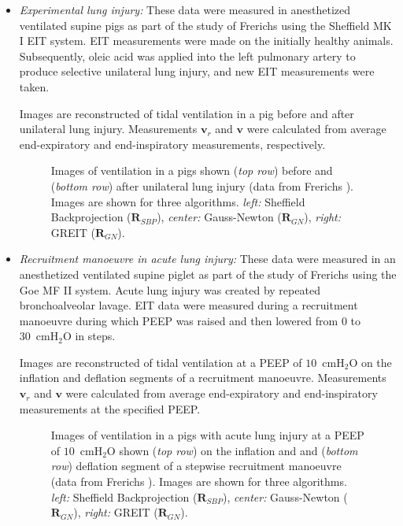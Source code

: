 \documentclass[12pt]{iopart}
\newcommand{\vB}{\mbox{$\mathbf{v}$}}
\newcommand{\RB}{\mbox{$\mathbf{R}$}}
\begin{document}
\begin{itemize}
\item
{\em Experimental lung injury:}
These data were measured in anesthetized
ventilated supine pigs as part of the study of
Frerichs  using the 
Sheffield MK I EIT system. EIT measurements
were made on the initially healthy animals.
Subsequently, oleic acid was applied 
into the left pulmonary artery to produce
selective unilateral lung injury, and new 
EIT measurements were taken. 

Images are reconstructed of tidal ventilation
in a pig before and after unilateral lung
injury. Measurements $\vB_r$ and $\vB$
were calculated from average end-expiratory
and end-inspiratory measurements, respectively.

\begin{figure}[bhtp]
\begin{center}
\caption{
\label{fig:Frerichs98images}
Images of ventilation in a pigs shown ({\em top row})
before and ({\em bottom row}) after unilateral
lung injury (data from Frerichs ).
Images are shown for three algorithms.
{\em left:} Sheffield Backprojection ($\RB_{SBP}$),
{\em center:} Gauss-Newton ($\RB_{GN}$),
{\em right:} GREIT ($\RB_{GN}$).
}
\end{center}
\end{figure}

\item
{\em Recruitment manoeuvre in acute lung injury:}
These data were measured in an anesthetized
ventilated supine piglet as part of the study of
Frerichs  using the 
Goe MF II system. Acute lung injury
was created by repeated
bronchoalveolar lavage. EIT data were
measured during a recruitment manoeuvre
during which PEEP was raised and then
lowered from 0 to 30~cmH$_2$O in steps. 

Images are reconstructed of tidal ventilation
at a PEEP of $10$~cmH$_2$O on the inflation
and deflation segments of a recruitment manoeuvre.
Measurements $\vB_r$ and $\vB$
were calculated from average end-expiratory
and end-inspiratory measurements at the specified
PEEP.

\begin{figure}[bhtp]
\begin{center}
\caption{
\label{fig:Frerichs98images}
Images of ventilation in a pigs with
acute lung injury 
at a PEEP of $10$~cmH$_2$O shown ({\em top row})
on the inflation and 
and ({\em bottom row})
deflation segment of a stepwise recruitment manoeuvre 
(data from Frerichs ).
Images are shown for three algorithms.
{\em left:} Sheffield Backprojection ($\RB_{SBP}$),
{\em center:} Gauss-Newton ($\RB_{GN}$),
{\em right:} GREIT ($\RB_{GN}$).
}
\end{center}
\end{figure}


\end{itemize}
\end{document}
